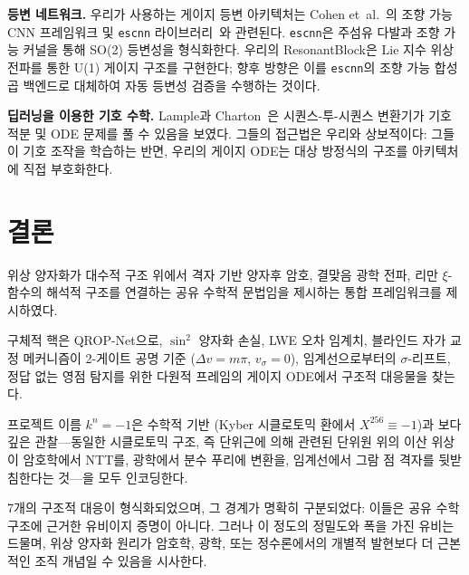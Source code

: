 \documentclass[11pt, a4paper]{article}
\theoremstyle{definition}
\theoremstyle{plain}
\newcommand{\xif}{\xi}
\begin{document}
\smallskip\noindent\textbf{등변 네트워크.}
우리가 사용하는 게이지 등변 아키텍처는 Cohen et~al.~\cite{Cohen2019Gauge}의
조향 가능 CNN 프레임워크 및 \texttt{escnn}
라이브러리~\cite{Cesa2022ESCNN}와 관련된다. \texttt{escnn}은 주섬유
다발과 조향 가능 커널을 통해 SO(2) 등변성을 형식화한다.
우리의 ResonantBlock은 Lie 지수 위상 전파를 통한 U(1) 게이지 구조를
구현한다; 향후 방향은 이를 \texttt{escnn}의 조향 가능 합성곱 백엔드로
대체하여 자동 등변성 검증을 수행하는 것이다.

\smallskip\noindent\textbf{딥러닝을 이용한 기호 수학.}
Lample과 Charton~\cite{Lample2020SymbolicMath}은 시퀀스-투-시퀀스
변환기가 기호 적분 및 ODE 문제를 풀 수 있음을 보였다.
그들의 접근법은 우리와 상보적이다: 그들이 기호 조작을 학습하는 반면,
우리의 게이지 ODE는 대상 방정식의 구조를 아키텍처에 직접 부호화한다.

\section{결론}
\label{sec:conclusion}

위상 양자화가 대수적 구조 위에서 격자 기반 양자후 암호, 결맞음 광학 전파, 리만 $\xif$-함수의 해석적 구조를 연결하는 공유 수학적 문법임을 제시하는 통합 프레임워크를 제시하였다.

구체적 핵은 QROP-Net으로, $\sin^2$ 양자화 손실, LWE 오차 임계치, 블라인드 자가 교정 메커니즘이 2-게이트 공명 기준 ($\Delta v = m\pi$, $v_\sigma = 0$), 임계선으로부터의 $\sigma$-리프트, 정답 없는 영점 탐지를 위한 다원적 프레임의 게이지 ODE에서 구조적 대응물을 찾는다.

프로젝트 이름 $k^n = -1$은 수학적 기반 (Kyber 시클로토믹 환에서 $X^{256} \equiv -1$)과 보다 깊은 관찰---동일한 시클로토믹 구조, 즉 단위근에 의해 관련된 단위원 위의 이산 위상이 암호학에서 NTT를, 광학에서 분수 푸리에 변환을, 임계선에서 그람 점 격자를 뒷받침한다는 것---을 모두 인코딩한다.

7개의 구조적 대응이 형식화되었으며, 그 경계가 명확히 구분되었다: 이들은 공유 수학 구조에 근거한 유비이지 증명이 아니다. 그러나 이 정도의 정밀도와 폭을 가진 유비는 드물며, 위상 양자화 원리가 암호학, 광학, 또는 정수론에서의 개별적 발현보다 더 근본적인 조직 개념일 수 있음을 시사한다.
\end{document}
